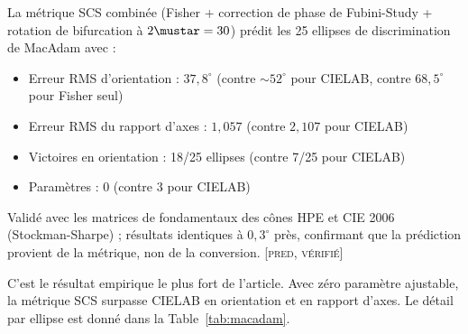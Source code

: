\documentclass[12pt,a4paper]{article}
\begin{document}
\begin{predictionbox}
La m\'etrique SCS combin\'ee (Fisher + correction de phase de
Fubini-Study + rotation de bifurcation \`a $2\mustar = 30$) pr\'edit les
25 ellipses de discrimination de MacAdam avec :
\begin{itemize}[nosep]
\item Erreur RMS d'orientation : $37{,}8^\circ$ (contre $\sim\!52^\circ$
  pour CIELAB, contre $68{,}5^\circ$ pour Fisher seul)
\item Erreur RMS du rapport d'axes : $1{,}057$ (contre $2{,}107$
  pour CIELAB)
\item Victoires en orientation : 18/25 ellipses (contre 7/25 pour CIELAB)
\item Param\`etres : 0 (contre 3 pour CIELAB)
\end{itemize}
Valid\'e avec les matrices de fondamentaux des c\^ones HPE et CIE 2006
(Stockman-Sharpe) ; r\'esultats identiques \`a $0{,}3^\circ$ pr\`es,
confirmant que la pr\'ediction provient de la m\'etrique, non de la
conversion. \textsc{[pred, v\'erifi\'e]}
\end{predictionbox}

C'est le r\'esultat empirique le plus fort de l'article. Avec z\'ero
param\`etre ajustable, la m\'etrique SCS surpasse CIELAB en orientation
et en rapport d'axes. Le d\'etail par ellipse est donn\'e dans la
Table~\ref{tab:macadam}.
\end{document}
